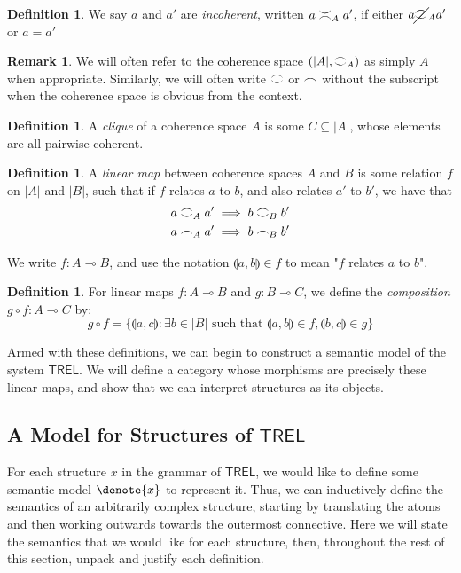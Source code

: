 \documentclass[11pt, oneside]{article}
\theoremstyle{plain}
\theoremstyle{definition}
\newtheorem{definition}[theorem]{Definition}
\newtheorem*{remark}{Remark}
\DeclarePairedDelimiter\denote\llbracket\rrbracket
\newcommand{\lp}{\llparenthesis}
\newcommand{\rp}{\rrparenthesis}
\newcommand{\sSys}{{\mathsf{TREL}}}%
\newcommand{\coh}[1][]{\mathrel{\vcenter{\offinterlineskip\hbox{$\frown$}\vskip0.2ex\hbox{$\smile$}}_{\ifx\\#1\\\else#1\fi}}}
\newcommand{\incoh}[1][]{\mathrel{\vcenter{\offinterlineskip\hbox{$\smile$}\vskip0.2ex\hbox{$\frown$}}_{\ifx\\#1\\\else#1\fi}}}
\newcommand{\notcoh}[1][]{\cancel{\coh}_{\ifx\\#1\\\else#1\fi}}
\newcommand{\scoh}[1][]{\mathrel{\frown}_{\ifx\\#1\\\else#1\fi}}
\newcommand{\comp}{\mathbin{\circ}}
\begin{document}
\begin{definition}
    We say $a$ and $a'$ are \textit{incoherent}, written $a \incoh[A] a'$, if either $a \notcoh[A] a'$ or $a=a'$
\end{definition}

\begin{remark}
    We will often refer to the coherence space $(|A|,\coh[A])$ as simply $A$ when appropriate.
    Similarly, we will often write $\coh$ or $\scoh$ without the subscript when the coherence space is obvious from the context.
\end{remark}

\begin{definition}
    A \textit{clique} of a coherence space $A$ is some $C \subseteq |A|$, whose elements are all pairwise coherent.
\end{definition}

\begin{definition}
    A \textit{linear map} between coherence spaces $A$ and $B$ is some relation $f$ on $|A|$ and $|B|$,
    such that if $f$ relates $a$ to $b$, and also relates $a'$ to $b'$, we have that
    \begin{align*}
        a \coh[A] a' &\implies b \coh[B] b' \\
        a \scoh[A] a' &\implies b \scoh[B] b'
    \end{align*}

    We write $f:A\multimap B$, and use the notation $\lp a,b\rp\in f$ to mean "$f$ relates $a$ to $b$".
\end{definition}

\begin{definition}
    For linear maps $f:A\multimap B$ and $g:B\multimap C$, we define the \textit{composition} $g\comp f:A\multimap C$ by:
    $$g\comp f = \{\lp a,c\rp:\exists b\in|B|\text{ such that }\lp a,b\rp\in f, \lp b,c\rp\in g\}$$
\end{definition}

Armed with these definitions, we can begin to construct a semantic model of the system $\sSys$.
We will define a category whose morphisms are precisely these linear maps, and show that we can interpret structures as its objects.

\subsection{A Model for Structures of $\sSys$}

For each structure $x$ in the grammar of $\sSys$, we would like to define some semantic model $\denote{x}$ to represent it.
Thus, we can inductively define the semantics of an arbitrarily complex structure, starting by translating the atoms and then working outwards towards the outermost connective.
Here we will state the semantics that we would like for each structure, then, throughout the rest of this section, unpack and justify each definition.
\end{document}

